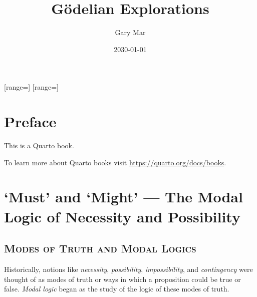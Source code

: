 \documentclass[
  12pt,
  letterpaper,
  DIV=11,
  numbers=noendperiod,
  twoside]{scrreprt}
\title{Gödelian Explorations}
\author{Gary Mar}
\date{2030-01-01}
\renewcommand*\contentsname{Table of contents}
\newcommand\contentsname{Table of contents}
\theoremstyle{remark}
\begin{document}
\maketitle

\renewcommand\phantomsection{}


\setlength{\parskipto}{\parskip}

\setlength{\floatsep}{0cm}
\setlength{\textfloatsep}{0cm}
\setlength{\intextsep}{0cm}

[range=\smwhtdiamond]
[range=]

\renewcommand*\contentsname{Table of contents}
{
\hypersetup{linkcolor=}
\setcounter{tocdepth}{2}
\tableofcontents
}

\chapter*{Preface}\label{preface}


This is a Quarto book.

To learn more about Quarto books visit
\url{https://quarto.org/docs/books}.


\chapter{`Must' and `Might' --- The Modal Logic of Necessity and
Possibility}\label{must-and-might-the-modal-logic-of-necessity-and-possibility}

\section{\texorpdfstring{\textsc{Modes of Truth and Modal
Logics}}{Modes of Truth and Modal Logics}}\label{modes-of-truth-and-modal-logics}

Historically, notions like \emph{necessity}, \emph{possibility},
\emph{impossibility}, and \emph{contingency} were thought of as modes of
truth or ways in which a proposition could be true or false. \emph{Modal
logic} began as the study of the logic of these modes of truth.
\end{document}
